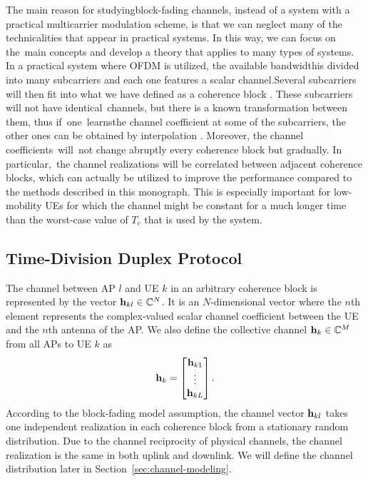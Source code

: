 \begin{remark}
The main reason for study\nolinebreak ing\linebreak block-fading channels, instead of a system with a practical multicarrier modulation scheme, is that we can neglect many of the technicalities that appear in practical systems. In this way, we can focus on the~main concepts and develop a theory that applies to many types of systems. In a practical system where \gls{OFDM} is utilized, the available band\nolinebreak width\linebreak is divided into many subcarriers and each one features a scalar chan\nolinebreak nel.\linebreak Several subcarriers will then fit into what we have defined as a coherence block \cite[Sec.~2.1.6]{Marzetta2016a}. These subcarriers will not have identical~channels, but there is a known transformation between them, thus if~one~learns\linebreak the channel coefficient at some of the subcarriers, the other ones can be obtained by interpolation \cite{Kashyap2016a}.
Moreover, the channel coefficients~will~not change abruptly every coherence block but gradually. In particular,~the channel realizations will be correlated between adjacent coherence blocks, which can actually be utilized to improve the performance compared to the methods described in this monograph. This is especially important for low-mobility UEs for which the channel might be constant for a much longer time than the worst-case value of $T_c$ that is used by the system.
\end{remark}

\enlargethispage{\baselineskip} 

\subsection{Time-Division Duplex Protocol}\label{sec:tdd-protocol}

The channel between AP $l$ and UE $k$ in an arbitrary coherence block is represented by the vector $\mathbf{h}_{kl} \in \mathbb{C}^N$. It is an $N$-dimensional vector where the $n$th element represents the complex-valued scalar channel coefficient between the UE and the $n$th antenna of the AP. We also define the collective channel $\mathbf{h}_k \in \mathbb{C}^{M}$ from all APs to UE $k$ as
\begin{equation}\label{eq:collective-channel}
\mathbf{h}_k = \begin{bmatrix} \mathbf{h}_{k1} \\ \vdots \\  \mathbf{h}_{kL}
\end{bmatrix}. 
\end{equation}
According to the block-fading model assumption, the channel vector $\mathbf{h}_{kl}$ takes one independent realization in each coherence block from a stationary random distribution. Due to the channel reciprocity of physical channels, the channel realization is the same in both uplink and downlink. We will define the channel distribution later in Section~\ref{sec:channel-modeling}.


